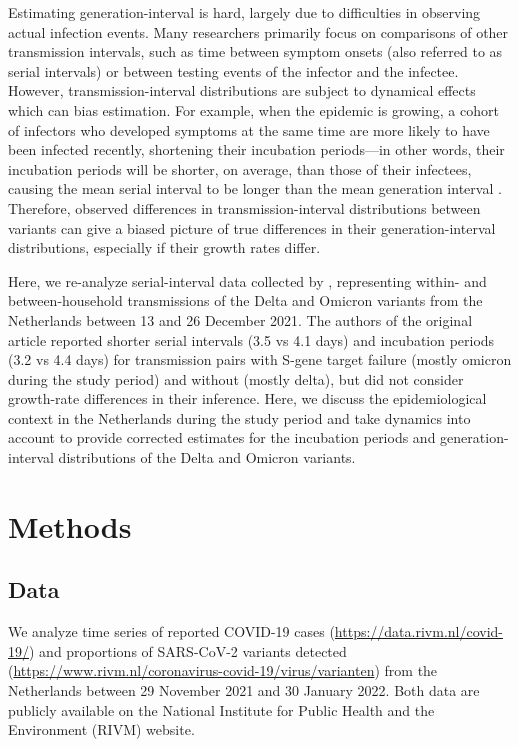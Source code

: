 \documentclass[12pt]{article}
\begin{document}
Estimating generation-interval is hard, largely due to difficulties in observing actual infection events.
Many researchers primarily focus on comparisons of other transmission intervals, such as time between symptom onsets (also referred to as serial intervals) or between testing events \citep{abbott2022test} of the infector and the infectee.
However, transmission-interval distributions are subject to dynamical effects which can bias estimation.
For example, when the epidemic is growing, a cohort of infectors who developed symptoms at the same time are more likely to have been infected recently, shortening their incubation periods---in other words, their incubation periods will be shorter, on average, than those of their infectees, causing the mean serial interval to be longer than the mean generation interval \citep{park2021forward}.
Therefore, observed differences in transmission-interval distributions between variants can give a biased picture of true differences in their generation-interval distributions, especially if their growth rates differ.

Here, we re-analyze serial-interval data collected by \citep{backer2021omicron}, representing within- and between-household transmissions of the Delta and Omicron variants from the Netherlands between 13 and 26 December 2021.
The authors of the original article reported shorter serial intervals (3.5 vs 4.1 days) and incubation periods (3.2 vs 4.4 days) for transmission pairs with S-gene target failure (mostly omicron during the study period) and without (mostly delta), but did not consider growth-rate differences in their inference.
Here, we discuss the epidemiological context in the Netherlands during the study period and take dynamics into account to provide corrected estimates for the incubation periods and generation-interval distributions of the Delta and Omicron variants.

\section{Methods}

\subsection{Data}

We analyze time series of reported COVID-19 cases (\url{https://data.rivm.nl/covid-19/}) and proportions of SARS-CoV-2 variants detected (\url{https://www.rivm.nl/coronavirus-covid-19/virus/varianten}) from the Netherlands between 29 November 2021 and 30 January 2022.
Both data are publicly available on the National Institute for Public Health and the Environment (RIVM) website.
\end{document}
